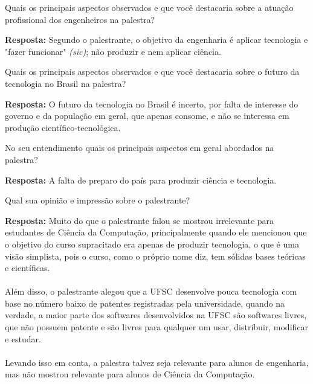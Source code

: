 \documentclass{article}
\begin{document}
\begin{enumerate} %

{\bf \item Quais os principais aspectos observados e que você destacaria sobre a atuação profissional dos engenheiros na palestra?}

{\bf Resposta:} Segundo o palestrante, o objetivo da engenharia é aplicar tecnologia e "fazer funcionar" {\it (sic)}; não produzir e nem aplicar ciência.

{\bf \item Quais os principais aspectos observados e que você destacaria sobre o futuro da tecnologia no Brasil na palestra?}

{\bf Resposta:} O futuro da tecnologia no Brasil é incerto, por falta de interesse do governo e da população em geral, que apenas consome, e não se interessa em produção científico-tecnológica.

{\bf \item No seu entendimento quais os principais aspectos em geral abordados na palestra?}

{\bf Resposta:} A falta de preparo do país para produzir ciência e tecnologia.

{\bf \item Qual sua opinião e impressão sobre o palestrante?}

{\bf Resposta:} Muito do que o palestrante falou se mostrou irrelevante para estudantes de Ciência da Computação, principalmente quando ele mencionou que o objetivo do curso supracitado era apenas de produzir tecnologia, o que é uma visão simplista, pois o curso, como o próprio nome diz, tem sólidas bases teóricas e científicas. 
\\\\Além disso, o palestrante alegou que a UFSC desenvolve pouca tecnologia com base no número baixo de patentes registradas pela universidade, quando na verdade, a maior parte dos softwares desenvolvidos na UFSC são softwares livres, que não possuem patente e são livres para qualquer um usar, distribuir, modificar e estudar. 
\\\\Levando isso em conta, a palestra talvez seja relevante para alunos de engenharia, mas não mostrou relevante para alunos de Ciência da Computação.


\end{enumerate}
\end{document}
